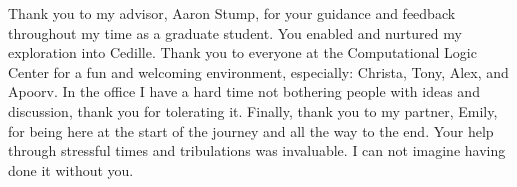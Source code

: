 \begin{acknowledgments}

Thank you to my advisor, Aaron Stump, for your guidance and feedback throughout my time as a graduate student.
You enabled and nurtured my exploration into Cedille.
Thank you to everyone at the Computational Logic Center for a fun and welcoming environment, especially: Christa, Tony, Alex, and Apoorv.
In the office I have a hard time not bothering people with ideas and discussion, thank you for tolerating it.
Finally, thank you to my partner, Emily, for being here at the start of the journey and all the way to the end.
Your help through stressful times and tribulations was invaluable.
I can not imagine having done it without you.

\end{acknowledgments}
